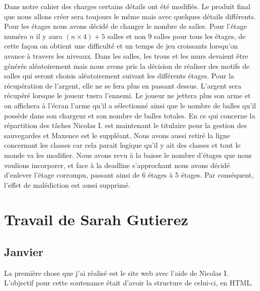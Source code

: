 \documentclass[]{extarticle}
\begin{document}
\begin{spacing}{1.25}
\bigbreak
\bigbreak
Dans notre cahier des charges certains détails ont été modifiés. Le produit final que nous allons créer sera toujours le même mais avec quelques détails différents. Pour les étages nous avons décidé de changer le nombre de salles. Pour l’étage numéro $n$ il y aura $(n\times4) + 5$ salles et non 9 salles pour tous les étages, de cette façon on obtient une difficulté et un temps de jeu croissants lorsqu'on avance à travers les niveaux.
\bigbreak
Dans les salles, les trous et les murs devaient être générés aléatoirement mais nous avons pris la décision de réaliser des motifs de salles qui seront choisis aléatoirement suivant les différents étages. 
\bigbreak
Pour la récupération de l’argent, elle ne se fera plus en passant dessus. L’argent sera récupéré lorsque le joueur tuera l’ennemi. 
\bigbreak
Le joueur ne jettera plus son arme et on affichera à l’écran l’arme qu'il a sélectionné ainsi que le nombre de balles qu'il possède dans son chargeur et son nombre de balles totales. 
\bigbreak
En ce qui concerne la répartition des tâches Nicolas I. est maintenant le titulaire pour la gestion des sauvegardes et Maxence est le suppléant. Nous avons aussi retiré la ligne concernant les classes car cela parait logique qu’il y ait des classes et tout le monde va les modifier.
\bigbreak
Nous avons revu à la baisse le nombre d'étages que nous voulions incorporer, et face à la deadline s'approchant nous avons décidé d'enlever l'étage corrompu, passant ainsi de 6 étages à 5 étages.
\bigbreak
Par conséquent, l'effet de malédiction est aussi supprimé.
\newpage

\section{Travail de Sarah Gutierez}

\subsection{Janvier}
\bigbreak
\bigbreak
La première chose que j’ai réalisé est le site web avec l’aide de Nicolas I. L’objectif pour cette soutenance était d’avoir la structure de celui-ci, en HTML. 


\end{spacing}
\end{document}
